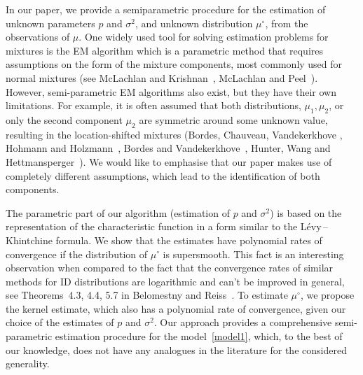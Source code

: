 \documentclass[a4paper,11pt]{article}
\theoremstyle{definition}
\newcommand{\1}{\mathbb{I}}
\theoremstyle{remark}
\begin{document}
In our paper, we provide a semiparametric procedure for the estimation of unknown parameters \(p\) and \(\sigma^2\), and unknown distribution \(\mu^\circ\), from the observations of \(\mu.\) 
One widely used tool for solving estimation problems for mixtures is the EM algorithm which is a parametric method that requires assumptions on the form of the mixture components, most commonly used for normal mixtures (see McLachlan and Krishnan~\cite{McLahclanEM}, McLachlan and Peel~\cite{McLachlan}). However, semi-parametric EM algorithms also exist, but they have their own limitations. For example, it is often assumed that both distributions, \(\mu_1, \mu_2\), or only the second component \(\mu_2\) are symmetric around some unknown value, resulting in the location-shifted mixtures (Bordes, Chauveau, Vandekerkhove \cite{Bordes}, Hohmann and Holzmann~\cite{Hohman}, Bordes and Vandekerkhove~\cite{Bordes2010}, Hunter,  Wang  and Hettmansperger~\cite{Hunter}). We would like to emphasise that our paper makes use of completely different assumptions, which lead to the identification of both components.

The parametric part of our algorithm (estimation of \(p\) and \(\sigma^2\)) is based on the representation of the characteristic function in a form similar to the L{\'e}vy\,--\,Khintchine formula.  We show that the estimates  have polynomial rates of convergence if the distribution of \(\mu^\circ\) is supersmooth. This fact is  an interesting observation when compared to the fact that the convergence rates of similar methods for ID distributions are logarithmic and can't be improved in general, see Theorems~4.3, 4.4, 5.7 in Belomestny and Reiss~\cite{BR2015}. To estimate \(\mu^\circ\), we propose the kernel estimate, which also has a polynomial rate of convergence, given our choice of the estimates of \(p\) and \(\sigma^2\). Our approach provides a  comprehensive semi-parametric estimation procedure for the model~\eqref{model1}, which, to the best of our knowledge, does not have any analogues in the literature for the considered generality. \newline
\end{document}
